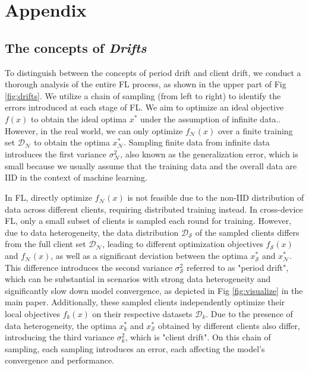 \section{Appendix}



\usetikzlibrary{tikzmark}

\subsection{The concepts of \textit{Drifts}}\label{appdx:concept}
To distinguish between the concepts of period drift and client drift, we conduct a thorough analysis of the entire FL process, as shown in the upper part of Fig \ref{fig:drifts}. We utilize a chain of sampling (from left to right) to identify the errors introduced at each stage of FL. We aim to optimize an ideal objective $f(x)$ to obtain the ideal optima $x^*$ under the assumption of infinite data.. However, in the real world, we can only optimize $f _ {\mathcal{N}}(x)$ over a finite training set $\mathcal{D} _ \mathcal{N}$ to obtain the optima $x^* _ {\mathcal{N}}$. Sampling finite data from infinite data introduces the first variance $\sigma _ {\mathcal{N}}^2$, also known as the generalization error, which is small because we usually assume that the training data and the overall data are IID in the context of machine learning. 

In FL, directly optimize $f _ {\mathcal{N}}(x)$ is not feasible due to the non-IID distribution of data across different clients, requiring distributed training instead. In cross-device FL, only a small subset of clients is sampled each round for training. However, due to data heterogeneity, the data distribution $\mathcal{D} _ \mathcal{S}$ of the sampled clients differs from the full client set $\mathcal{D} _ \mathcal{N}$, leading to different optimization objectives $f _ {\mathcal{S}}(x)$ and $f _ {\mathcal{N}}(x)$, as well as a significant deviation between the optima $x^* _ {\mathcal{S}}$ and $x^* _ {\mathcal{N}}$. This difference introduces the second variance $\sigma _ {\mathcal{S}}^2$ referred to as "period drift", which can be substantial in scenarios with strong data heterogeneity and significantly slow down model convergence, as depicted in Fig \ref{fig:visualize} in the main paper. 
Additionally, these sampled clients independently optimize their local objectives $f _ k(x)$ on their respective datasets $\mathcal{D} _ k$. Due to the presence of data heterogeneity, the optima $x^* _ k$ and $x^* _ {\mathcal{S}}$ obtained by different clients also differ, introducing the third variance $\sigma _ {k}^2$, which is "client drift". On this chain of sampling, each sampling introduces an error, each affecting the model's convergence and performance.


